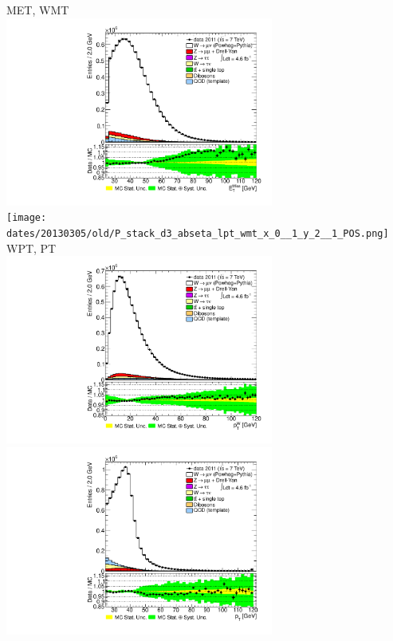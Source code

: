 
 {
\colb[T]

MET, WMT \\
\centering
\includegraphics[width=0.66\textwidth]{dates/20130305/old/P_stack_d3_abseta_lpt_met_x_0__1_y_2__1_POS.pdf} \\
\texttt{[image: dates/20130305/old/P\_stack\_d3\_abseta\_lpt\_wmt\_x\_0\_\_1\_y\_2\_\_1\_POS.png]}
WPT, PT \\
\centering
\includegraphics[width=0.66\textwidth]{dates/20130305/old/P_stack_d3_abseta_lpt_wpt_x_0__1_y_2__1_POS} \\
\includegraphics[width=0.66\textwidth]{dates/20130305/old/P_stack_lpt_POS} 
\cole
}

